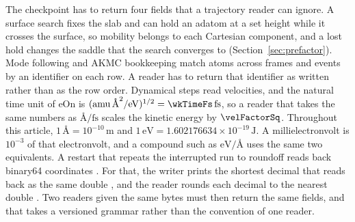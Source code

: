 \documentclass[preprint,12pt]{elsarticle}
\begin{document}
The checkpoint has to return four fields that a trajectory reader can
ignore.
A surface search fixes the slab and can hold an adatom at a set height
while it crosses the surface, so mobility belongs to each Cartesian
component, and a lost hold changes the saddle that the search converges
to (Section~\ref{sec:prefactor}).
Mode following and AKMC bookkeeping match atoms across frames and events
by an identifier on each row.
A reader has to return that identifier as written rather than as the row
order.
Dynamical steps read velocities, and the natural time unit of eOn is
\((\mathrm{amu}\,\text{\AA}^2/\mathrm{eV})^{1/2}=\wkTimeFs\,\mathrm{fs}\),
so a reader that takes the same numbers as \(\text{\AA}/\mathrm{fs}\)
scales the kinetic energy by \(\velFactorSq\).
Throughout this article, \(1\,\text{\AA}=10^{-10}\,\mathrm{m}\) and
\(1\,\mathrm{eV}=1.602176634\times10^{-19}\,\mathrm{J}\).
A millielectronvolt is \(10^{-3}\) of that electronvolt, and a compound
such as \(\mathrm{eV}/\text{\AA}\) uses the same two equivalents.
A restart that repeats the interrupted run to roundoff reads back
binary64 coordinates
\cite{ieeecomputersocietyIeeeStandardFloatingpoint2019}.
For that, the writer prints the shortest decimal that reads back as the
same double
\cite{steeleHowPrintFloatingpoint1990,adamsRyFastFloattostring2018}, and
the reader rounds each decimal to the nearest double
\cite{clingerHowReadFloating1990}.
Two readers given the same bytes must then return the same fields, and
that takes a versioned grammar rather than the convention of one reader.
\end{document}
